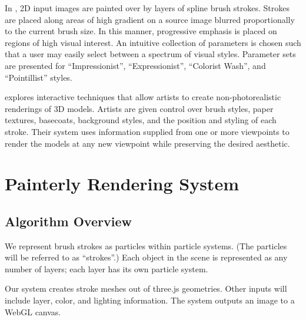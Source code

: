 \documentclass[conference]{acmsiggraph}
\begin{document}
In \cite{Hertzmann:1998:PRC:280814.280951}, 2D input images are painted over
by layers of spline brush strokes. Strokes are placed along areas of high
gradient on a source image blurred proportionally to the current brush size. In
this manner, progressive emphasis is  placed on regions of high visual
interest. An intuitive collection of parameters is chosen such that a user may
easily select between a spectrum of visual styles. Parameter sets are presented
for ``Impressionist'', ``Expressionist'', ``Colorist Wash'', and ``Pointillist''
styles.

\cite{Kalnins:2002:WND:566570.566648} explores interactive techniques that
allow artists to create non-photorealistic renderings of 3D models. Artists are
given control over brush styles, paper textures, basecoats, background styles,
and the position and styling of each stroke. Their system uses information
supplied from one or more viewpoints to render the models at any new viewpoint
while preserving the desired aesthetic.



\section{Painterly Rendering System}

\subsection{Algorithm Overview}

We represent brush strokes as particles within particle systems. (The particles
will be referred to as ``strokes''.) Each object in the scene is represented as
any number of layers; each layer has its own particle system.

Our system creates stroke meshes out of three.js geometries. Other inputs will
include layer, color, and lighting information. The system outputs an image to
a WebGL canvas.

\end{document}
